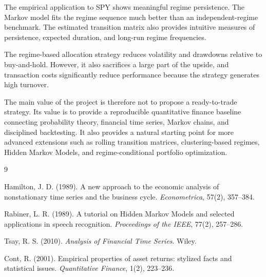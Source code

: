\documentclass[11pt,a4paper]{article}
\begin{document}
The empirical application to SPY shows meaningful regime persistence. The Markov model fits the regime sequence much better than an independent-regime benchmark. The estimated transition matrix also provides intuitive measures of persistence, expected duration, and long-run regime frequencies.

The regime-based allocation strategy reduces volatility and drawdowns relative to buy-and-hold. However, it also sacrifices a large part of the upside, and transaction costs significantly reduce performance because the strategy generates high turnover.

The main value of the project is therefore not to propose a ready-to-trade strategy. Its value is to provide a reproducible quantitative finance baseline connecting probability theory, financial time series, Markov chains, and disciplined backtesting. It also provides a natural starting point for more advanced extensions such as rolling transition matrices, clustering-based regimes, Hidden Markov Models, and regime-conditional portfolio optimization.

\begin{thebibliography}{9}

Hamilton, J. D. (1989).
A new approach to the economic analysis of nonstationary time series and the business cycle.
\emph{Econometrica}, 57(2), 357--384.

Rabiner, L. R. (1989).
A tutorial on Hidden Markov Models and selected applications in speech recognition.
\emph{Proceedings of the IEEE}, 77(2), 257--286.

Tsay, R. S. (2010).
\emph{Analysis of Financial Time Series}.
Wiley.

Cont, R. (2001).
Empirical properties of asset returns: stylized facts and statistical issues.
\emph{Quantitative Finance}, 1(2), 223--236.

\end{thebibliography}
\end{document}
